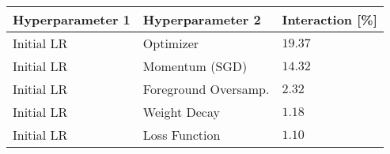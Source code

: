\begin{tabular}{lll}
\toprule
Hyperparameter 1 & Hyperparameter 2 & Interaction [\%] \\
\midrule
Initial LR & Optimizer & $19.37$ \\
Initial LR & Momentum (SGD) & $14.32$ \\
Initial LR & Foreground Oversamp. & $2.32$ \\
Initial LR & Weight Decay & $1.18$ \\
Initial LR & Loss Function & $1.10$ \\
\bottomrule
\end{tabular}
